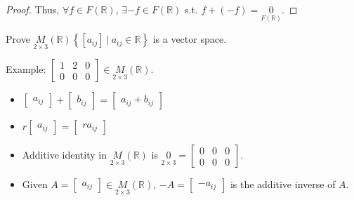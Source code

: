 \documentclass[11pt,fleqn]{book} %
\begin{document}
\begin{example}
\begin{itemize}
\begin{itemize}
\begin{proof}
            Thus, $\forall f \in F(\mathbb{R})$, $\exists -f \in F(\mathbb{R})$ s.t. $f + (-f) = \underset{F(\mathbb{R})}{0}$.
            \end{proof}
        \end{itemize}
    \end{itemize}
\end{example}

\begin{example}
    Prove $\underset{2 \times 3}{M}(\mathbb{R}) \left\{ [a_{ij}] ~|~ a_{ij} \in \mathbb{R} \right\}$ is a vector space.

    Example: $\begin{bmatrix}  1 &2 &0 \\ 0 &0 & 0 \end{bmatrix} \in \underset{2 \times 3}{M}(\mathbb{R})$.
    \begin{itemize}
        \item $\begin{bmatrix} a_{ij} \end{bmatrix} + \begin{bmatrix} b_{ij} \end{bmatrix} = \begin{bmatrix} a_{ij}+b_{ij} \end{bmatrix}$

        \item $r\begin{bmatrix} a_{ij} \end{bmatrix} = \begin{bmatrix} ra_{ij} \end{bmatrix}$

        \item Additive identity in $\underset{2\times3}M(\mathbb{R})$ is $\underset{2\times3}{0} = \begin{bmatrix} 0&0&0\\0&0&0 \end{bmatrix}$.

        \item Given $A = \begin{bmatrix} a_{ij} \end{bmatrix} \in \underset{2\times3}M(\mathbb{R})$, $-A = \begin{bmatrix} -a_{ij} \end{bmatrix}$ is the additive inverse of $A$.
    \end{itemize}
\end{example}
\end{document}

